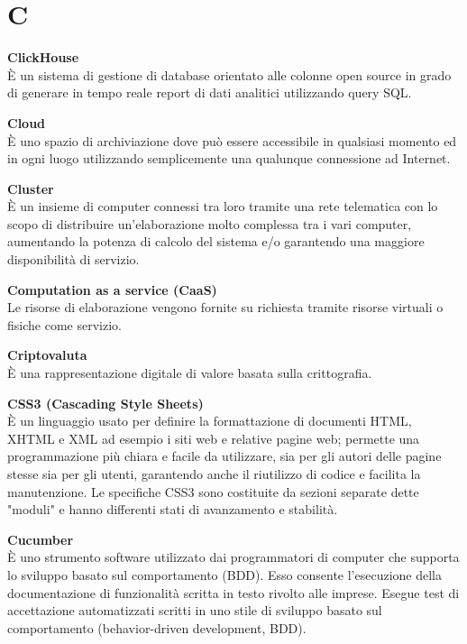 \section{C}
\textbf{ClickHouse}\\
È un sistema di gestione di database orientato alle colonne open source in grado di generare in tempo reale report di dati analitici utilizzando query SQL.

\textbf{Cloud}\\
È uno spazio di archiviazione dove può essere accessibile in qualsiasi momento ed in ogni luogo utilizzando semplicemente una qualunque connessione ad Internet.

\textbf{Cluster}\\
È un insieme di computer connessi tra loro tramite una rete telematica con lo scopo di distribuire un'elaborazione molto complessa tra i vari computer, aumentando la potenza di calcolo del sistema e/o garantendo una maggiore disponibilità di servizio.

\textbf{Computation as a service (CaaS)}\\
Le risorse di elaborazione vengono fornite su richiesta tramite risorse virtuali o fisiche come servizio.

\textbf{Criptovaluta}\\
È una rappresentazione digitale di valore basata sulla crittografia.

\textbf{CSS3 (Cascading Style Sheets)}\\
È un linguaggio usato per definire la formattazione di documenti HTML, XHTML e XML ad esempio i siti web e relative pagine web; permette una programmazione più chiara e facile da utilizzare, sia per gli autori delle pagine stesse sia per gli utenti, garantendo anche il riutilizzo di codice e facilita la manutenzione. Le specifiche CSS3 sono costituite da sezioni separate dette "moduli" e hanno differenti stati di avanzamento e stabilità.

\textbf{Cucumber}\\
È uno strumento software utilizzato dai programmatori di computer che supporta lo sviluppo basato sul comportamento (BDD). Esso consente l'esecuzione della documentazione di funzionalità scritta in testo rivolto alle imprese. Esegue test di accettazione automatizzati scritti in uno stile di sviluppo basato sul comportamento (behavior-driven development, BDD).

\clearpage